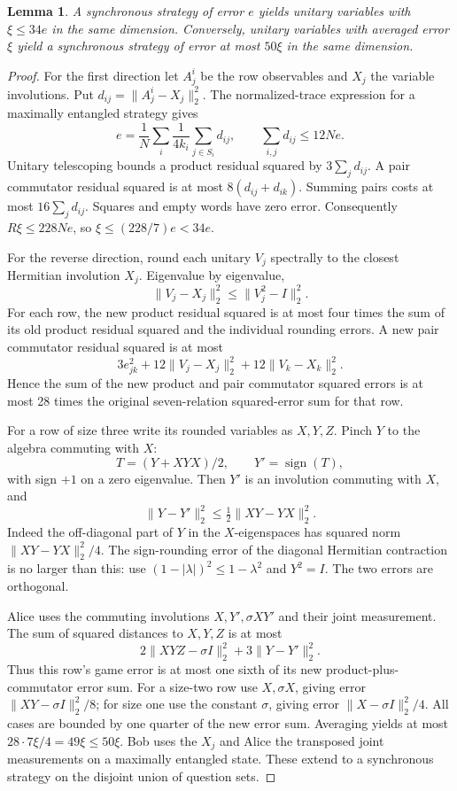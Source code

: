 \documentclass[11pt,a4paper]{article}
\newtheorem{lemma}[theorem]{Lemma}
\newcommand{\norm}[1]{\lVert#1\rVert}
\begin{document}
\begin{lemma}\label{lem:gamewords}
A synchronous strategy of error $e$ yields unitary variables with $\xi\le34e$ in the same dimension. Conversely, unitary variables with averaged error $\xi$ yield a synchronous strategy of error at most $50\xi$ in the same dimension.
\end{lemma}
\begin{proof}
For the first direction let $A^i_j$ be the row observables and $X_j$ the variable involutions. Put $d_{ij}=\norm{A^i_j-X_j}_2^2$. The normalized-trace expression for a maximally entangled strategy gives
\[
 e=\frac1N\sum_i\frac1{4k_i}\sum_{j\in S_i}d_{ij},
 \qquad \sum_{i,j}d_{ij}\le12Ne.
\]
Unitary telescoping bounds a product residual squared by $3\sum_jd_{ij}$. A pair commutator residual squared is at most $8(d_{ij}+d_{ik})$. Summing pairs costs at most $16\sum_jd_{ij}$. Squares and empty words have zero error. Consequently $R\xi\le228Ne$, so $\xi\le(228/7)e<34e$.

For the reverse direction, round each unitary $V_j$ spectrally to the closest Hermitian involution $X_j$. Eigenvalue by eigenvalue,
\[
 \norm{V_j-X_j}_2^2\le\norm{V_j^2-I}_2^2.
\]
For each row, the new product residual squared is at most four times the sum of its old product residual squared and the individual rounding errors. A new pair commutator residual squared is at most
\[
 3e_{jk}^2+12\norm{V_j-X_j}_2^2+12\norm{V_k-X_k}_2^2.
\]
Hence the sum of the new product and pair commutator squared errors is at most 28 times the original seven-relation squared-error sum for that row.

For a row of size three write its rounded variables as $X,Y,Z$. Pinch $Y$ to the algebra commuting with $X$:
\[
 T=(Y+XYX)/2,\qquad Y'=\operatorname{sign}(T),
\]
with sign $+1$ on a zero eigenvalue. Then $Y'$ is an involution commuting with $X$, and
\begin{equation}
 \norm{Y-Y'}_2^2\le\tfrac12\norm{XY-YX}_2^2.             \label{eq:pinch}
\end{equation}
Indeed the off-diagonal part of $Y$ in the $X$-eigenspaces has squared norm $\norm{XY-YX}_2^2/4$. The sign-rounding error of the diagonal Hermitian contraction is no larger than this: use $(1-|\lambda|)^2\le1-\lambda^2$ and $Y^2=I$. The two errors are orthogonal.

Alice uses the commuting involutions $X,Y',\sigma XY'$ and their joint measurement. The sum of squared distances to $X,Y,Z$ is at most
\[
 2\norm{XYZ-\sigma I}_2^2+3\norm{Y-Y'}_2^2.
\]
Thus this row's game error is at most one sixth of its new product-plus-commutator error sum. For a size-two row use $X,\sigma X$, giving error $\norm{XY-\sigma I}_2^2/8$; for size one use the constant $\sigma$, giving error $\norm{X-\sigma I}_2^2/4$. All cases are bounded by one quarter of the new error sum. Averaging yields at most
$28\cdot7\xi/4=49\xi\le50\xi$.
Bob uses the $X_j$ and Alice the transposed joint measurements on a maximally entangled state. These extend to a synchronous strategy on the disjoint union of question sets.
\end{proof}
\end{document}
